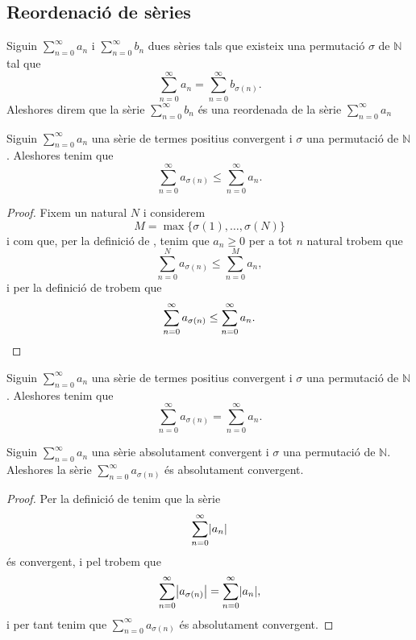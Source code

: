 \documentclass[../Apunts.tex]{subfiles}
\begin{document}
	\subsection{Reordenació de sèries}
	\begin{definition}
		\label{def:reordenada d'una sèrie}
		Siguin \(\sum_{n=0}^{\infty}a_{n}\) i \(\sum_{n=0}^{\infty}b_{n}\) dues sèries tals que existeix una permutació \(\sigma\) de \(\mathbb{N}\) tal que
		\[\sum_{n=0}^{\infty}a_{n}=\sum_{n=0}^{\infty}b_{\sigma(n)}.\]
		Aleshores direm que la sèrie \(\sum_{n=0}^{\infty}b_{n}\) és una reordenada de la sèrie \(\sum_{n=0}^{\infty}a_{n}\)
	\end{definition}
	\begin{lemma}
		\label{lema:la reordenada d'una sèrie de termes positius convergent és més petita que la sèrie}
		Siguin \(\sum_{n=0}^{\infty}a_{n}\) una sèrie de termes positius convergent i \(\sigma\) una permutació de \(\mathbb{N}\). Aleshores tenim que
		\[\sum_{n=0}^{\infty}a_{\sigma(n)}\leq\sum_{n=0}^{\infty}a_{n}.\]
		\begin{proof}
			Fixem un natural \(N\) i considerem
			\[M=\max\{\sigma(1),\dots,\sigma(N)\}\]
			i com que, per la definició de , tenim que \(a_{n}\geq0\) per a tot \(n\) natural trobem que
			\[\sum_{n=0}^{N}a_{\sigma(n)}\leq\sum_{n=0}^{M}a_{n},\]
			i per la definició de  trobem que
			\[\sum_{n=0}^{\infty}a_{\sigma(n)}\leq\sum_{n=0}^{\infty}a_{n}.\qedhere\]
		\end{proof}
	\end{lemma}
	\begin{corollary}
		\label{cor:la reordenada d'una sèrie de termes positius convergent conserva la sèrie}
		Siguin \(\sum_{n=0}^{\infty}a_{n}\) una sèrie de termes positius convergent i \(\sigma\) una permutació de \(\mathbb{N}\). Aleshores tenim que
		\[\sum_{n=0}^{\infty}a_{\sigma(n)}=\sum_{n=0}^{\infty}a_{n}.\]
	\end{corollary}
	\begin{proposition}
		\label{prop:la reordenada d'una sèrie absolutament convergent és absolutament convergent}
		Siguin \(\sum_{n=0}^{\infty}a_{n}\) una sèrie absolutament convergent i \(\sigma\) una permutació de \(\mathbb{N}\). Aleshores la sèrie \(\sum_{n=0}^{\infty}a_{\sigma(n)}\) és absolutament convergent.
		\begin{proof}
			Per la definició de  tenim que la sèrie
			\[\sum_{n=0}^{\infty}\abs{a_{n}}\]
			és convergent, i pel \corollari{}  trobem que
			\[\sum_{n=0}^{\infty}\abs{a_{\sigma(n)}}=\sum_{n=0}^{\infty}\abs{a_{n}},\]
			i per tant tenim que \(\sum_{n=0}^{\infty}a_{\sigma(n)}\) és absolutament convergent.
		\end{proof}
	\end{proposition}
\end{document}
